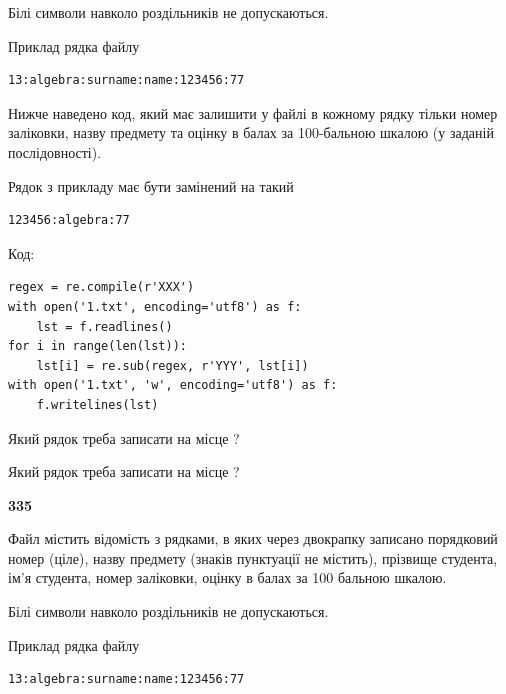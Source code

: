 Білі символи навколо роздільників не допускаються.

Приклад рядка файлу



\begin{verbatim}
13:algebra:surname:name:123456:77
\end{verbatim}


Нижче наведено код, який має залишити у файлі в кожному рядку тільки номер заліковки, назву предмету та оцінку в балах за 100-бальною шкалою (у заданій послі\-дов\-ності).

Рядок з прикладу має бути замінений на такий



\begin{verbatim}
123456:algebra:77
\end{verbatim}




Код:



\begin{verbatim}
regex = re.compile(r'XXX')
with open('1.txt', encoding='utf8') as f:
    lst = f.readlines()
for i in range(len(lst)):
    lst[i] = re.sub(regex, r'YYY', lst[i])
with open('1.txt', 'w', encoding='utf8') as f:
    f.writelines(lst)
\end{verbatim}







Який рядок треба записати на місце  ?\par
\vspace{5mm}


Який рядок треба записати на місце  ?\par


\newpage

{\begin {center}\textbf{ 335}\end {center}}\par
Файл  містить відомість з рядками, в яких через двокрапку записано поряд\-ковий номер (ціле), назву предмету (знаків пунктуації не містить), прізвище студента, ім'я студента, номер заліковки, оцінку в балах за 100 бальною шкалою.

Білі символи навколо роздільників не допускаються.

Приклад рядка файлу



\begin{verbatim}
13:algebra:surname:name:123456:77
\end{verbatim}


